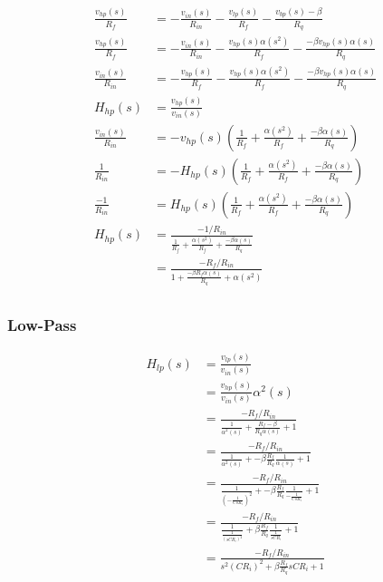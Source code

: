 \documentclass{article}
\begin{document}
\begin{equation*}
\begin{split}
  \frac{v_{hp}(s)}{R_{f}} & = - \frac{v_{in}(s)}{R_{in}} - \frac{v_{lp}(s)}{R_{f}} - \frac{v_{bp}(s)-\beta}{R_q} \\
  \frac{v_{hp}(s)}{R_{f}} & = - \frac{v_{in}(s)}{R_{in}} - \frac{v_{hp}(s)\alpha(s^2)}{R_{f}} - \frac{{-\beta}v_{hp}(s)\alpha(s)}{R_q} \\
  \frac{v_{in}(s)}{R_{in}} & = - \frac{v_{hp}(s)}{R_{f}} - \frac{v_{hp}(s)\alpha(s^2)}{R_{f}} - \frac{{-\beta}v_{hp}(s)\alpha(s)}{R_q} \\
  H_{hp}(s) & = \frac{v_{hp}(s)}{v_{in}(s)} \\
  \frac{v_{in}(s)}{R_{in}} & = - v_{hp}(s)(\frac{1}{R_{f}} + \frac{\alpha(s^2)}{R_{f}} + \frac{{-\beta}\alpha(s)}{R_q}) \\
  \frac{1}{R_{in}} & = - H_{hp}(s)(\frac{1}{R_{f}} + \frac{\alpha(s^2)}{R_{f}} + \frac{{-\beta}\alpha(s)}{R_q}) \\
  \frac{-1}{R_{in}} & = H_{hp}(s)(\frac{1}{R_{f}} + \frac{\alpha(s^2)}{R_{f}} + \frac{{-\beta}\alpha(s)}{R_q}) \\
  H_{hp}(s) & = \frac{-1/R_{in}}{\frac{1}{R_{f}} + \frac{\alpha(s^2)}{R_{f}} + \frac{{-\beta}\alpha(s)}{R_q}} \\
  & = \frac{-R_{f}/R_{in}}{1 + \frac{{-\beta}R_{f}\alpha(s)}{R_q} + \alpha(s^2) } \\
\end{split}
\end{equation*}

\subsubsection{Low-Pass}

\begin{equation*}
\begin{split}
  H_{lp}(s) & = \frac{v_{lp}(s)}{v_{in}(s)} \\
            & = \frac{v_{hp}(s)}{v_{in}(s)}\alpha^2(s) \\
            & = \frac{-R_{f}/R_{in}}{\frac{1}{\alpha^2(s)} + \frac{R_{f}-\beta}{R_q\alpha(s)} + 1 } \\
            & = \frac{-R_{f}/R_{in}}{\frac{1}{\alpha^2(s)} + -\beta\frac{R_{f}}{R_q}\frac{1}{\alpha(s)} + 1 } \\
            & = \frac{-R_{f}/R_{in}}{\frac{1}{{(-\frac{1}{CsR_{i}})}^2} + -\beta\frac{R_{f}}{R_q}\frac{1}{-\frac{1}{CsR_{i}}} + 1 } \\
            & = \frac{-R_{f}/R_{in}}{\frac{1}{{\frac{1}{(sCR_{i})^2}}} + \beta\frac{R_{f}}{R_q}\frac{1}{\frac{1}{sCR_{i}}} + 1 } \\
            & = \frac{-R_{f}/R_{in}}{s^2(CR_{i})^2 + \beta\frac{R_{f}}{R_q}sCR_{i} + 1 } \\
\end{split}
\end{equation*}
\end{document}
